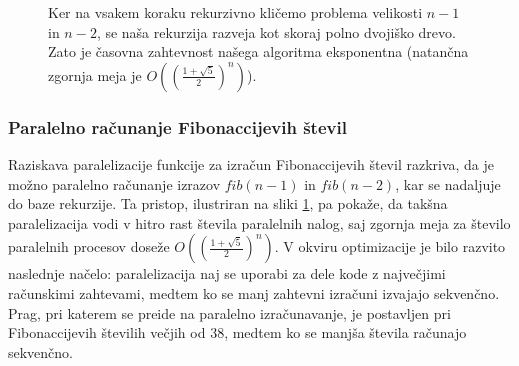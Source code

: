 \documentclass[fin1, tisk]{fmfdelo}
\begin{document}
\begin{figure}[htb]
  \centering
  \caption{Ker na vsakem koraku rekurzivno kličemo problema velikosti $n-1$ in $n-2$, se naša rekurzija razveja
  kot skoraj polno dvojiško drevo. Zato je časovna zahtevnost našega algoritma eksponentna (natančna zgornja meja je 
  $O((\frac{1 + \sqrt{5}}{2})^n)$).}
  \label{fig:fib-graph}
\end{figure}

\subsubsection{Paralelno računanje Fibonaccijevih števil}

Raziskava paralelizacije funkcije za izračun Fibonaccijevih števil razkriva, da je možno paralelno računanje izrazov
$fib(n-1)$ in $fib(n-2)$, kar se nadaljuje do baze rekurzije. Ta pristop, ilustriran na sliki \ref{fig:fib-graph}, pa
pokaže, da takšna paralelizacija vodi v hitro rast števila paralelnih nalog, saj zgornja meja za število paralelnih
procesov doseže $O((\frac{1 + \sqrt{5}}{2})^n)$.
V okviru optimizacije je bilo razvito naslednje načelo: paralelizacija naj se uporabi za dele kode z največjimi
računskimi zahtevami, medtem ko se manj zahtevni izračuni izvajajo sekvenčno. Prag, pri katerem se preide na paralelno
izračunavanje, je postavljen pri Fibonaccijevih številih večjih od $38$, medtem ko se manjša števila računajo sekvenčno.
\end{document}
